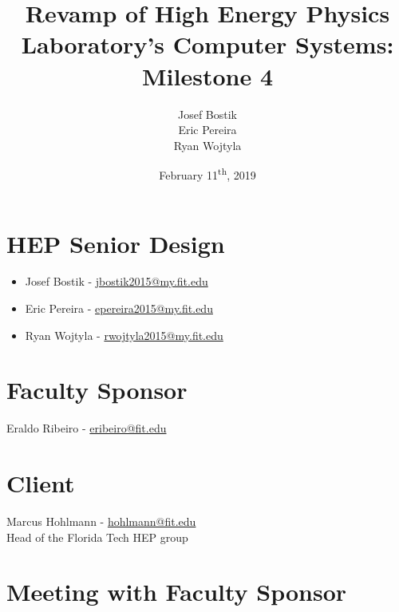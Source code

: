 \documentclass[12pt]{article}
\newcommand\tab[1][1cm]{\hspace*{#1}}
\begin{document}
	

\begin{titlepage}
	
\author{Josef Bostik\\
	Eric Pereira\\
	Ryan Wojtyla\\}
\date{February 11\textsuperscript{th}, 2019}
\title{Revamp of High Energy Physics Laboratory's Computer Systems: Milestone 4}

\maketitle

\end{titlepage}

\tableofcontents

\newpage {}

\section{HEP Senior Design}

\begin{itemize}
	\item Josef Bostik - \href{mailto:jbostik2015@my.fit.edu}{jbostik2015@my.fit.edu}
	\item Eric Pereira - \href{mailto:epereira2015@my.fit.edu}{epereira2015@my.fit.edu }
	\item Ryan Wojtyla - \href{mailto:rwojtyla2015@my.fit.edu}{rwojtyla2015@my.fit.edu}
\end{itemize}

\section{Faculty Sponsor}

\tab Eraldo Ribeiro - \href{mailto:eribeiro@fit.edu}{eribeiro@fit.edu}

\section{Client}

\tab Marcus Hohlmann - \href{mailto:hohlmann@fit.edu}{hohlmann@fit.edu} \\ 
\tab Head of the Florida Tech HEP group

\section{Meeting with Faculty Sponsor}
\end{document}
